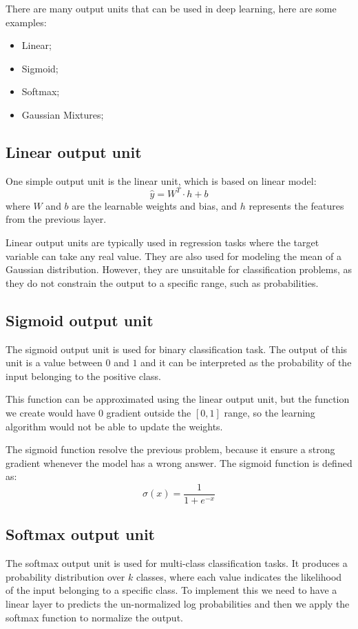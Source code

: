 There are many output units that can be used in deep learning, here are some examples:
\begin{itemize}
    \item Linear;
    \item Sigmoid;
    \item Softmax;
    \item Gaussian Mixtures;
\end{itemize}
\subsection{Linear output unit}
One simple output unit is the linear unit, which is based on linear model:
\begin{equation}
    \hat{y} = W^T \cdot h + b
\end{equation}
where $W$ and $b$ are the learnable weights and bias, and $h$ represents the features
from the previous layer.

Linear output units are typically used in regression tasks where the target variable
can take any real value. They are also used for modeling the mean of a Gaussian
distribution. However, they are unsuitable for classification problems, as they
do not constrain the output to a specific range, such as probabilities.
\subsection{Sigmoid output unit}
The sigmoid output unit is used for binary classification task. The output
of this unit is a value between $0$ and $1$ and it can be interpreted as the
probability of the input belonging to the positive class.

This function can be approximated using the linear output unit, but the function
we create would have 0 gradient outside the $[0, 1]$ range, so the learning
algorithm would not be able to update the weights.

The sigmoid function resolve the previous problem, because it ensure a strong
gradient whenever the model has a wrong answer. The sigmoid function is defined as:
\begin{equation}
    \sigma(x) = \frac{1}{1+e^{-x}}
\end{equation}
\subsection{Softmax output unit}
The softmax output unit is used for multi-class classification tasks. It produces
a probability distribution over $k$ classes, where each value indicates the likelihood
of the input belonging to a specific class. To implement this we need to have a
linear layer to predicts the un-normalized log probabilities and then we apply
the softmax function to normalize the output.

